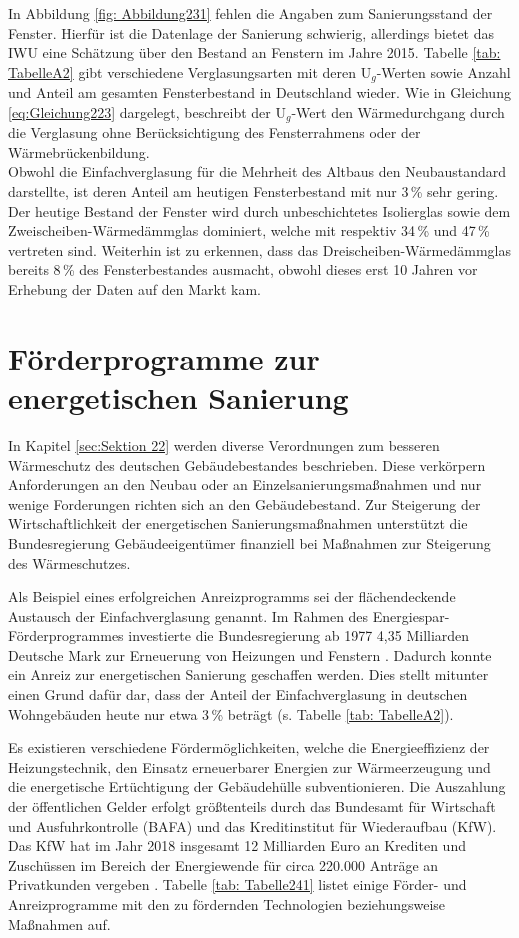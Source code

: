 In Abbildung \ref{fig: Abbildung231} fehlen die Angaben zum Sanierungsstand der Fenster.
Hierfür ist die Datenlage der Sanierung schwierig, allerdings bietet das IWU eine Schätzung über den Bestand an Fenstern im Jahre 2015.
Tabelle \ref{tab: TabelleA2} gibt verschiedene Verglasungsarten mit deren U\(_g\)-Werten sowie Anzahl und Anteil am gesamten Fensterbestand in Deutschland wieder.
Wie in Gleichung \ref{eq:Gleichung223} dargelegt, beschreibt der U\(_g\)-Wert den Wärmedurchgang durch die Verglasung ohne Berücksichtigung des Fensterrahmens oder der Wärmebrückenbildung.\\
Obwohl die Einfachverglasung für die Mehrheit des Altbaus den Neubaustandard darstellte, ist deren Anteil am heutigen Fensterbestand mit nur 3\,\% sehr gering. 
Der heutige Bestand der Fenster wird durch unbeschichtetes Isolierglas sowie dem Zweischeiben-Wärmedämmglas dominiert, welche mit respektiv 34\,\% und 47\,\% vertreten sind.
Weiterhin ist zu erkennen, dass das Dreischeiben-Wärmedämmglas bereits 8\,\% des Fensterbestandes ausmacht, obwohl dieses erst 10 Jahren vor Erhebung der Daten auf den Markt kam.  \cite{Bigalke.2016}

\section{Förderprogramme zur energetischen Sanierung}
\label{sec:Sektion 24}

In Kapitel \ref{sec:Sektion 22} werden diverse Verordnungen zum besseren Wärmeschutz des deutschen Gebäudebestandes beschrieben.
Diese verkörpern Anforderungen an den Neubau oder an Einzelsanierungsmaßnahmen und nur wenige Forderungen richten sich an den Gebäudebestand.
Zur Steigerung der Wirtschaftlichkeit der energetischen Sanierungsmaßnahmen unterstützt die Bundesregierung Gebäudeeigentümer finanziell bei Maßnahmen zur Steigerung des Wärmeschutzes.

Als Beispiel eines erfolgreichen Anreizprogramms sei der flächendeckende Austausch der Einfachverglasung genannt.
Im Rahmen des Energiespar-Förderprogrammes investierte die Bundesregierung ab 1977 4,35 Milliarden Deutsche Mark zur Erneuerung von Heizungen und Fenstern \cite{EickeHenning.2011b}.
Dadurch konnte ein Anreiz zur energetischen Sanierung geschaffen werden.
Dies stellt mitunter einen Grund dafür dar, dass der Anteil der Einfachverglasung in deutschen Wohngebäuden heute nur etwa 3\,\% beträgt (s. Tabelle \ref{tab: TabelleA2}).

Es existieren verschiedene Fördermöglichkeiten, welche die Energieeffizienz der Heizungstechnik, den Einsatz erneuerbarer Energien zur Wärmeerzeugung und die energetische Ertüchtigung der Gebäudehülle subventionieren.
Die Auszahlung der öffentlichen Gelder erfolgt größtenteils durch das Bundesamt für Wirtschaft und Ausfuhrkontrolle (BAFA) und das Kreditinstitut für Wiederaufbau (KfW).
Das KfW hat im Jahr 2018 insgesamt 12 Milliarden Euro an Krediten und Zuschüssen im Bereich der Energiewende für circa 220.000 Anträge an Privatkunden vergeben \cite{KfW_Report18}. 
Tabelle \ref{tab: Tabelle241} listet einige Förder- und Anreizprogramme mit den zu fördernden Technologien beziehungsweise Maßnahmen auf.

